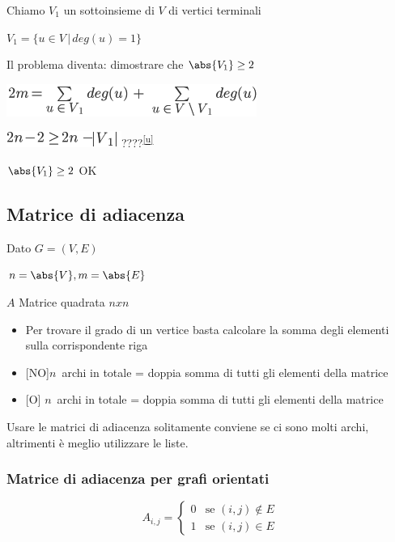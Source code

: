 \documentclass{article}
\providecommand{\tightlist}{%
  \setlength{\itemsep}{0pt}\setlength{\parskip}{0pt}}
\begin{document}
{{Chiamo $V_1$ un sottoinsieme di $V$ di vertici terminali}

$V_1=\{u\in V\,|\,deg(u)=1\}$

{Il problema diventa: dimostrare che $\abs{V_1} \geq 2$}

\includegraphics{images/image382.png}

\includegraphics{images/image383.png}{????}\textsuperscript{\protect\hyperlink{cmnt21}{{[}u{]}}}

{$\abs{V_1} \geq 2$ OK}

\hypertarget{h.viqjw1dxzez8}{\subsection{\texorpdfstring{{Matrice di
adiacenza }}{Matrice di adiacenza }}\label{h.viqjw1dxzez8}}

{Dato }$G=(V,E)${~}

$n=\abs{V},m=\abs{E}$

{$A$ Matrice quadrata $n x n$ }

\begin{itemize}
\tightlist
\item
  {Per trovare il grado di un vertice basta calcolare la somma degli
  elementi sulla corrispondente riga}
\item
  {{[}NO{]}}$n${~archi in totale =
  doppia somma di tutti gli elementi della matrice}
\item
  {{[}O{]} }$n${~archi in totale =
  doppia somma di tutti gli elementi della matrice}
\end{itemize}

{}

{Usare le matrici di adiacenza solitamente conviene se ci sono molti
archi, altrimenti è meglio utilizzare le liste.}

\hypertarget{h.30h8k4akc7l}{\subsubsection{\texorpdfstring{{Matrice di adiacenza per grafi orientati}}{Matrice di adiacenza per grafi orientati}}\label{h.30h8k4akc7l}}


\begin{equation}
A_{i,j} = 
\begin{cases}
0 & \mbox{se } (i,j) \notin E \\ 
1 & \mbox{se } (i,j) \in E
\end{cases}
\end{equation}

}
\end{document}
